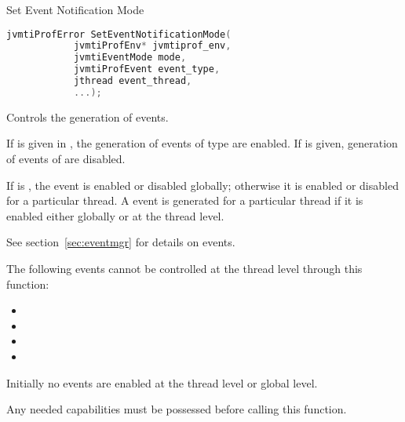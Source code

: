 \begin{apidef}{Set Event Notification Mode}
\begin{lstlisting}[language=C]
jvmtiProfError SetEventNotificationMode(
            jvmtiProfEnv* jvmtiprof_env,
            jvmtiEventMode mode,
            jvmtiProfEvent event_type,
            jthread event_thread,
            ...);
\end{lstlisting}

\begin{apidesc}
Controls the generation of events.

If  is given in , the generation of events of type  are enabled. If  is given, generation of events of  are disabled.

If  is , the event is enabled or disabled globally; otherwise it is enabled or disabled for a particular thread. A event is generated for a particular thread if it is enabled either globally or at the thread level.

See section~\ref{sec:eventmgr} for details on events.

The following events cannot be controlled at the thread level through this function:
\begin{itemize}
\item {}
\item {}
\item {}
\item {}
\end{itemize}

Initially no events are enabled at the thread level or global level.

Any needed capabilities must be possessed before calling this function.
\end{apidesc}

\begin{apiphase}
\apiphaseonloadlive
\end{apiphase}

\begin{apicap}
\apicaprequired


\end{apicap}
\end{apidef}

